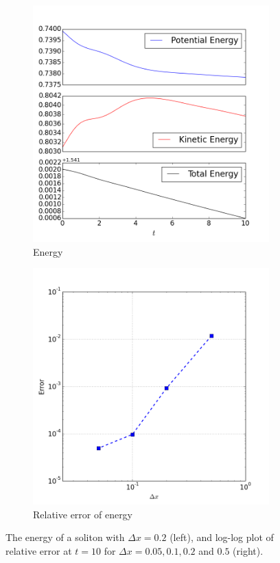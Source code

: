 \documentclass[review]{elsarticle}
\begin{document}
\begin{figure}[!htb]
    \centering
    \begin{subfigure}[b]{0.45\textwidth}
        \includegraphics[width=\textwidth]{_fig/soliton_energy.png}
        \caption{Energy}
        \label{fig:soliton_energy}
    \end{subfigure}
    \begin{subfigure}[b]{0.45\textwidth}
        \includegraphics[width=\textwidth]{_fig/soliton_energy_dx.png}
        \caption{Relative error of energy}
        \label{fig:soliton_energy_dx}
    \end{subfigure}
    \caption{The energy of a soliton 
    with $\Delta x = 0.2$ (left), 
    and log-log plot of relative error 
    at $t=10$ for $\Delta x = 0.05, 0.1, 0.2$ and $0.5$ (right).}
    \label{fig:soliton_error_energy}
\end{figure}
\end{document}
